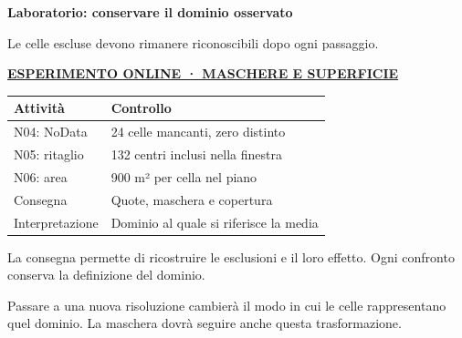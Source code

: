 \documentclass[12pt,aspectratio=1610]{beamer}
\newcommand{\PBody}[1]{\par{\fontsize{11.3}{14.8}\selectfont #1\par}}
\newcommand{\PSmall}[1]{\par{\fontsize{9.8}{13.1}\selectfont #1\par}}
\newcommand{\PInfo}[1]{%
\begin{tcolorbox}[enhanced,arc=1.6mm,boxrule=.55pt,colback=GeoTint,
 colframe=Rule!80!Classical,left=2.3mm,right=2.3mm,top=2mm,bottom=2mm,
 before skip=1mm,after skip=1mm]
\PSmall{#1}\end{tcolorbox}}
\newcommand{\PLab}[2]{\par{\color{Classical}\bfseries\fontsize{9}{11}\selectfont
\href{#1}{\MakeUppercase{#2}}}\par\vspace{1.8mm}}
\begin{document}
\begin{frame}[plain]\hypertarget{slide32}{}
\begin{lrbox}{\TitleBox}
\begin{minipage}[t]{17.7cm}\raggedright\color{Ink}\fontsize{11.3}{14.8}\selectfont
\color{Navy}\bfseries\fontsize{20.6}{24.5}\selectfont Laboratorio: conservare il dominio osservato
\end{minipage}\end{lrbox}

\begin{lrbox}{\RecallBox}
\begin{minipage}[t]{14.3cm}\raggedright\color{Ink}\fontsize{11.3}{14.8}\selectfont
\fontsize{10.3}{13.8}\selectfont Le celle escluse devono rimanere riconoscibili dopo ogni passaggio.
\end{minipage}\end{lrbox}

\begin{lrbox}{\PilotLeftBox}
\begin{minipage}[t]{10.05cm}\raggedright\color{Ink}\fontsize{11.3}{14.8}\selectfont
\PLab{https://marzione00.github.io/Lab_Geo/\#laboratorio/m12-maschere}{Esperimento online · maschere e superficie}
{\fontsize{10.2}{13.1}\selectfont\renewcommand{\arraystretch}{1.45}\begin{tabular}{@{}p{4.2cm}p{4.8cm}@{}}\toprule
\textbf{Attività} & \textbf{Controllo}\\\midrule
N04: NoData & 24 celle mancanti, zero distinto\\
N05: ritaglio & 132 centri inclusi nella finestra\\
N06: area & 900 m² per cella nel piano\\
Consegna & Quote, maschera e copertura\\
Interpretazione & Dominio al quale si riferisce la media\\
\bottomrule\end{tabular}}

\end{minipage}\end{lrbox}

\begin{lrbox}{\PilotRightBox}
\begin{minipage}[t]{7.55cm}\raggedright\color{Ink}\fontsize{11.3}{14.8}\selectfont
\PBody{La consegna permette di ricostruire le esclusioni e il loro effetto. Ogni confronto conserva la definizione del dominio.}
\vspace{2.5mm}
\PInfo{Passare a una nuova risoluzione cambierà il modo in cui le celle rappresentano quel dominio. La maschera dovrà seguire anche questa trasformazione.}


\end{minipage}
\end{lrbox}
\end{frame}
\end{document}
